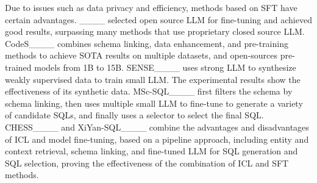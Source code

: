 Due to issues such as data privacy and efficiency, methods based on SFT have certain advantages. ____ selected open source LLM for fine-tuning and achieved good results, surpassing many methods that use proprietary closed source LLM. CodeS____ combines schema linking, data enhancement, and pre-training methods to achieve SOTA results on multiple datasets, and open-sources pre-trained models from 1B to 15B. SENSE____ uses strong LLM to synthesize weakly supervised data to train small LLM. The experimental results show the effectiveness of its synthetic data.  MSc-SQL____ first filters the schema by schema linking, then uses multiple small LLM to fine-tune to generate a variety of candidate SQLs, and finally uses a selector to select the final SQL. CHESS____ and XiYan-SQL____ combine the advantages and disadvantages of ICL and model fine-tuning, based on a pipeline approach, including entity and context retrieval, schema linking, and fine-tuned LLM for SQL generation and SQL selection, proving the effectiveness of the combination of ICL and SFT methods.

